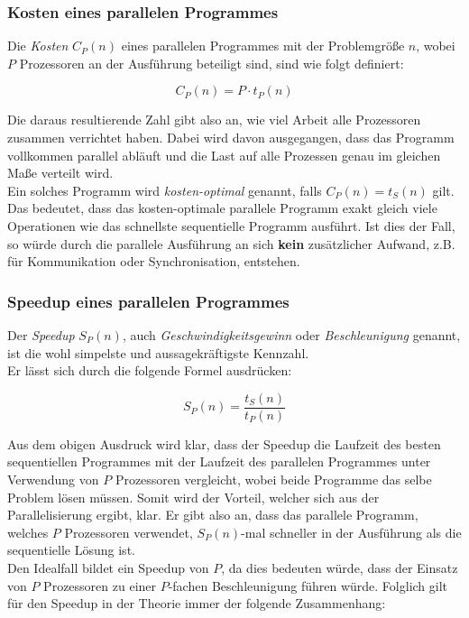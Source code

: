 			
			\subsubsection{Kosten eines parallelen Programmes}
			
				Die \textit{Kosten} $C_P(n)$ eines parallelen Programmes mit der Problemgröße $n$, wobei $P$ Prozessoren an der Ausführung beteiligt sind, sind wie folgt definiert:
				
				\[ C_P(n) = P \cdot t_P(n) \]
				
				Die daraus resultierende Zahl gibt also an, wie viel Arbeit alle Prozessoren zusammen verrichtet haben. Dabei wird davon ausgegangen, dass das Programm vollkommen parallel abläuft und die Last auf alle Prozessen genau im gleichen Maße verteilt wird.\\
				Ein solches Programm wird \textit{kosten-optimal} genannt, falls $C_P(n) = t_S(n)$ gilt. Das bedeutet, dass das kosten-optimale parallele Programm exakt gleich viele Operationen wie das schnellste sequentielle Programm ausführt. Ist dies der Fall, so würde durch die parallele Ausführung an sich \textbf{kein} zusätzlicher Aufwand, z.B. für Kommunikation oder Synchronisation, entstehen.
				
			\subsubsection{Speedup eines parallelen Programmes}
				\label{Speedup}
			
				Der \textit{Speedup} $S_P(n)$, auch \textit{Geschwindigkeitsgewinn} oder \textit{Beschleunigung} genannt, ist die wohl simpelste und aussagekräftigste Kennzahl.\\
				Er lässt sich durch die folgende Formel ausdrücken:
				
				\[ S_P(n) = \frac{t_S(n)}{t_P(n)} \]
				
				Aus dem obigen Ausdruck wird klar, dass der Speedup die Laufzeit des besten sequentiellen Programmes mit der Laufzeit des parallelen Programmes unter Verwendung von $P$ Prozessoren vergleicht, wobei beide Programme das selbe Problem lösen müssen. Somit wird der Vorteil, welcher sich aus der Parallelisierung ergibt, klar. Er gibt also an, dass das parallele Programm, welches $P$ Prozessoren verwendet, $S_P(n)$-mal schneller in der Ausführung als die sequentielle Lösung ist.\\
				Den Idealfall bildet ein Speedup von $P$, da dies bedeuten würde, dass der Einsatz von $P$ Prozessoren zu einer $P$-fachen Beschleunigung führen würde. Folglich gilt für den Speedup in der Theorie immer der folgende Zusammenhang:
				
